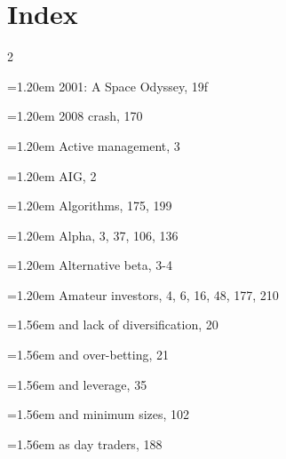\chapter*{Index}  {} 

{\footnotesize
\setlength{\parindent}{0pt} \setlength{\parskip}{0pt}

\begin{multicols}{2} \raggedright\raggedcolumns \setlength{\columnsep}{1.2em}
\par \noindent\hangindent=1.20em\hspace*{0.00em} 2001: A Space Odyssey, 19f
\par \noindent\hangindent=1.20em\hspace*{0.00em} 2008 crash, 170
\par \noindent\hangindent=1.20em\hspace*{0.00em} Active management, 3
\par \noindent\hangindent=1.20em\hspace*{0.00em} AIG, 2
\par \noindent\hangindent=1.20em\hspace*{0.00em} Algorithms, 175, 199
\par \noindent\hangindent=1.20em\hspace*{0.00em} Alpha, 3, 37, 106, 136
\par \noindent\hangindent=1.20em\hspace*{0.00em} Alternative beta, 3-4
\par \noindent\hangindent=1.20em\hspace*{0.00em} Amateur investors, 4, 6, 16, 48, 177, 210
\par \noindent\hangindent=1.56em\hspace*{0.36em} and lack of diversification, 20
\par \noindent\hangindent=1.56em\hspace*{0.36em} and over-betting, 21
\par \noindent\hangindent=1.56em\hspace*{0.36em} and leverage, 35
\par \noindent\hangindent=1.56em\hspace*{0.36em} and minimum sizes, 102
\par \noindent\hangindent=1.56em\hspace*{0.36em} as day traders, 188

\end{multicols}}
